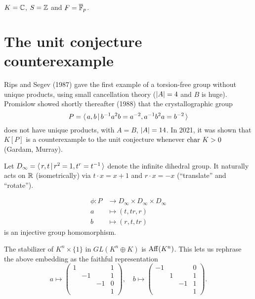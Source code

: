 \begin{example}
    $K = \mathbb{C}$, $S = \mathbb{Z}$ and $F = \overline{\mathbb{F}}_p$.
\end{example}

\section{The unit conjecture counterexample}

Rips and Segev (1987) gave the first example of a torsion-free group without unique products, using small cancellation theory ($\lvert A \rvert = 4$ and $B$ is huge).
Promislow showed shortly thereafter (1988) that the crystallographic group \[
    P = \langle \, a, b \, | \, b^{-1} a^2 b = a^{-2}, a^{-1} b^2 a = b^{-2} \, \rangle
\]
does not have unique products, with $A = B$, $\lvert A \rvert = 14$.
In 2021, it was shown that $K[P]$ is a counterexample to the unit conjecture whenever $\mathrm{char}\ K > 0$ (Gardam, Murray).

Let $D_\infty = \langle \, r, t \, | \, r^2 = 1, t^r = t^{-1} \, \rangle$ denote the infinite dihedral group.
It naturally acts on $\mathbb{R}$ (isometrically) via $t \cdot x = x+1$ and $r \cdot x = -x$ (``translate'' and ``rotate'').

\begin{lemma}
    \label{lemma:promislow_embedding}
    \begin{align*}
        \phi \colon P &\to D_\infty \times D_\infty \times D_\infty \\
        a &\mapsto (t, tr, r) \\
        b &\mapsto (r, t, tr)
    \end{align*}
    is an injective group homomorphism.
\end{lemma}

\begin{remark}
    The stabilizer of $K^n \times \{1\}$ in $GL(K^n \oplus K)$ is $\mathrm{Aff}(K^n)$.
    This lets us rephrase the above embedding as the faithful representation \[
        a \mapsto \begin{pmatrix}
            1 &    &    & 1 \\
              & -1 &    & 1 \\
              &    & -1 & 0 \\
              &    &    & 1
        \end{pmatrix},
        \quad
        b \mapsto \begin{pmatrix}
            -1 &   &    & 0 \\
               & 1 &    & 1 \\
               &   & -1 & 1 \\
               &   &    & 1
        \end{pmatrix}.
     \]
\end{remark}

